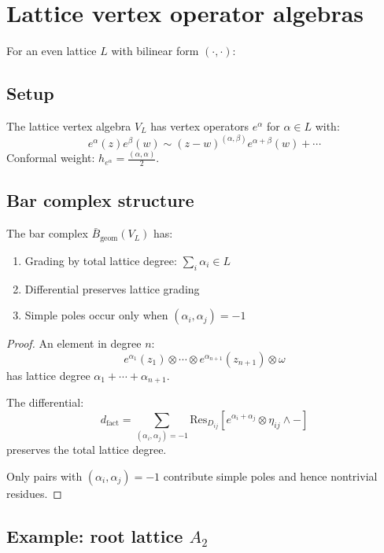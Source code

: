 \section{Lattice vertex operator algebras}

For an even lattice $L$ with bilinear form $(\cdot, \cdot)$:
 
\subsection{Setup}
 
\begin{definition}
The lattice vertex algebra $V_L$ has vertex operators $e^\alpha$ for $\alpha \in L$ with:
\[
e^\alpha(z)e^\beta(w) \sim (z-w)^{(\alpha,\beta)} e^{\alpha+\beta}(w) + \cdots
\]
Conformal weight: $h_{e^\alpha} = \frac{(\alpha,\alpha)}{2}$.
\end{definition}
 
\subsection{Bar complex structure}
 
\begin{theorem}
\label{thm:lattice-voa-bar}
The bar complex $\bar{B}_{\text{geom}}(V_L)$ has:
\begin{enumerate}
\item Grading by total lattice degree: $\sum_i \alpha_i \in L$
\item Differential preserves lattice grading
\item Simple poles occur only when $(\alpha_i, \alpha_j) = -1$
\end{enumerate}
\end{theorem}
 
\begin{proof}
An element in degree $n$:
\[
e^{\alpha_1}(z_1) \otimes \cdots \otimes e^{\alpha_{n+1}}(z_{n+1}) \otimes \omega
\]
has lattice degree $\alpha_1 + \cdots + \alpha_{n+1}$.
 
The differential:
\[
d_{\text{fact}} = \sum_{(\alpha_i,\alpha_j)=-1} \text{Res}_{D_{ij}}\left[e^{\alpha_i+\alpha_j} \otimes \eta_{ij} \wedge -\right]
\]
preserves the total lattice degree.
 
Only pairs with $(\alpha_i, \alpha_j) = -1$ contribute simple poles and hence nontrivial residues.
\end{proof}
 
\subsection{\texorpdfstring{Example: root lattice $A_2$}{Example: root lattice A-2}}
 
